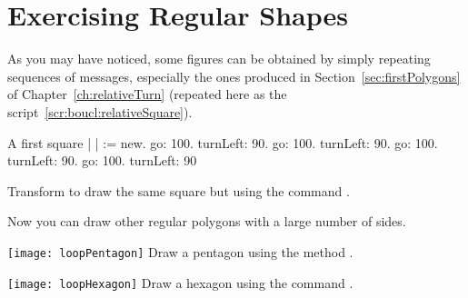 


\section{Exercising Regular Shapes}
As you may have noticed, some figures can be obtained by simply
repeating sequences of messages, especially the ones produced in
Section~\ref{sec:firstPolygons} of Chapter~\ref{ch:relativeTurn} (repeated here as the script~\ref{scr:boucl:relativeSquare}). 


\begin{scriptwithtitle}{A first square} \label{scr:boucl:relativeSquare}
| \caro |
\caro := \Turtle new.
\caro go: 100.
\caro turnLeft: 90.
\caro go: 100.
\caro turnLeft: 90.
\caro go: 100.
\caro turnLeft: 90.
\caro go: 100.
\caro turnLeft: 90
\end{scriptwithtitle}


\begin{exonofig}\label{exo:squareRepeat}
Transform \newcommand{\remove}[1]{the}  to
draw the same square but using the command \timesRepeat.
\end{exonofig}

Now you \newcommand{\replace}[2]{should be able to}{can} draw other regular polygons with a large
number of sides.


\begin{exofigwithsize}{\texttt{[image: loopPentagon]}} \label{exo:pentagonRepeat}
Draw a pentagon using the method \timesRepeat.
\end{exofigwithsize}

\begin{exofigwithsize}{\texttt{[image: loopHexagon]}}\label{exo:hexagonRepeat}
Draw a hexagon using the command \timesRepeat.
\end{exofigwithsize}


